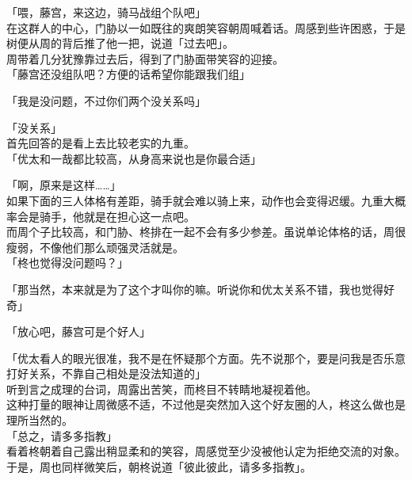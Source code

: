 「喂，藤宫，来这边，骑马战组个队吧」\\

在这群人的中心，门胁以一如既往的爽朗笑容朝周喊着话。周感到些许困惑，于是树便从周的背后推了他一把，说道「过去吧」。\\

周带着几分犹豫靠过去后，得到了门胁面带笑容的迎接。\\

「藤宫还没组队吧？方便的话希望你能跟我们组」

「我是没问题，不过你们两个没关系吗」

「没关系」\\

首先回答的是看上去比较老实的九重。\\

「优太和一哉都比较高，从身高来说也是你最合适」

「啊，原来是这样……」\\

如果下面的三人体格有差距，骑手就会难以骑上来，动作也会变得迟缓。九重大概率会是骑手，他就是在担心这一点吧。\\

而周个子比较高，和门胁、柊排在一起不会有多少参差。虽说单论体格的话，周很瘦弱，不像他们那么顽强灵活就是。\\

「柊也觉得没问题吗？」

「那当然，本来就是为了这个才叫你的嘛。听说你和优太关系不错，我也觉得好奇」

「放心吧，藤宫可是个好人」

「优太看人的眼光很准，我不是在怀疑那个方面。先不说那个，要是问我是否乐意打好关系，不靠自己相处是没法知道的」\\

听到言之成理的台词，周露出苦笑，而柊目不转睛地凝视着他。\\

这种打量的眼神让周微感不适，不过他是突然加入这个好友圈的人，柊这么做也是理所当然的。\\

「总之，请多多指教」\\

看着柊朝着自己露出稍显柔和的笑容，周感觉至少没被他认定为拒绝交流的对象。于是，周也同样微笑后，朝柊说道「彼此彼此，请多多指教」。
